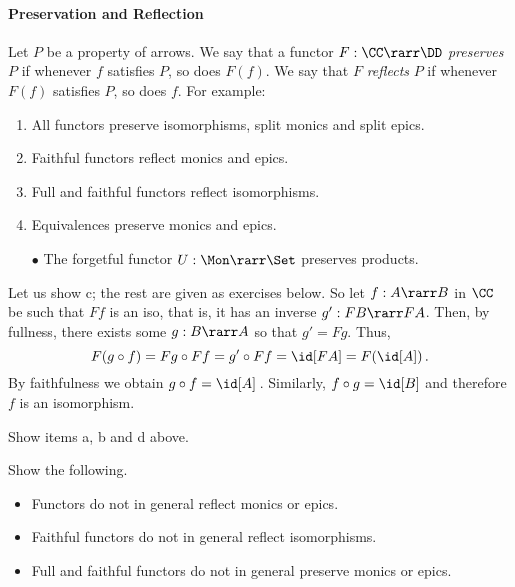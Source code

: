 \documentclass[12pt]{article}
\begin{document}
\paragraph{Preservation and Reflection}
Let $P$ be a property of arrows. We say that a functor $F :\CC \rarr \DD$ \emph{preserves} $P$ if whenever $f$ satisfies $P$, so does $F(f)$. We say
that $F$ \emph{reflects} $P$ if whenever $F(f)$ satisfies $P$, so does $f$. For example:
\begin{enumerate}\renewcommand{\theenumi}{\normalfont\alph{enumi}}
\item All functors preserve isomorphisms, split monics and split epics.
\item Faithful functors reflect monics and epics.
\item Full and faithful functors reflect isomorphisms.
\item Equivalences preserve monics and epics.
\item[$\bullet$\;] The forgetful functor $U:\Mon\rarr\Set$ preserves products.
\end{enumerate}
Let us show c; the rest are given as exercises below. So let $f:A\rarr B$ in $\CC$ be such that $Ff$ is an iso, that is, it has an inverse $g':FB\rarr
FA$. Then, by fullness, there exists some $g:B\rarr A$ so that $g'=Fg$. Thus,
\[ F(g\circ f)=Fg\circ Ff=g'\circ Ff=\id[FA]=F(\id[A])\,. \]
By faithfulness we obtain $g\circ f=\id[A]$\,. Similarly, $f\circ g=\id[B]$ and therefore $f$ is an isomorphism.

\begin{myexercise}
Show items a, b and d above.
\end{myexercise}
\begin{myexercise}
Show the following.
\begin{itemize}
  \item Functors do not in general reflect monics or epics.
  \item Faithful functors do not in general reflect isomorphisms.
  \item Full and faithful functors do not in general preserve monics or epics.
\end{itemize}
\end{myexercise}
\end{document}
